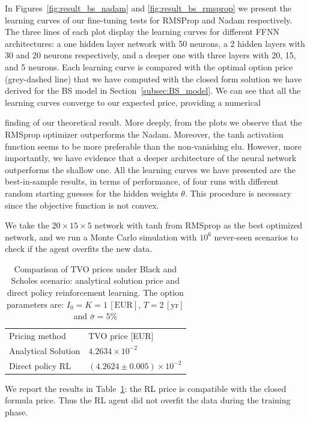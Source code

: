 \documentclass[runningheads]{m2ef}
\newcommand\soutpars[1]{\let\helpcmd\sout\parhelp#1\par\relax\relax}
\newcommand{\change}[1]{{\color{red} {#1}}}%
\newcommand{\remove}[1]{{\color{red} \soutpars{{#1}}}}%
\begin{document}
In Figures~\ref{fig:result_bs_nadam} and \ref{fig:result_bs_rmsprop} we present the learning curves of our fine-tuning tests for RMSProp and Nadam respectively. The three lines of each plot display the learning curves for different FFNN architectures: a one hidden layer network with 50 neurons, a 2 hidden layers with 30 and 20 neurons respectively, and a deeper one with three layers with 20, 15, and 5 neurons. Each learning curve is compared with the optimal option price (grey-dashed line) that we have computed with the closed form solution we have derived for the BS model in Section~\ref{subsec:BS_model}. We can see that all the learning curves converge to our expected price, providing a numerical \remove{demonstration} \change{finding} of our theoretical result. More deeply, from the plots we observe that the RMSprop optimizer outperforms the Nadam. Moreover, the tanh activation function seems to be more preferable than the non-vanishing elu. However, more importantly, we have evidence that a deeper architecture of the neural network outperforms the shallow one. All the learning curves we have presented are the best-in-sample results, in terms of performance, of four runs with different random starting guesses for the hidden weights $\theta$. This procedure is necessary since the objective function is not convex.

We take the $20\times 15 \times 5$ network with tanh from RMSprop as the best optimized network, and we run a Monte Carlo simulation with $10^6$ never-seen scenarios to check if the agent overfits the new data. 
\begin{table}
\begin{center}
\caption{Comparison of TVO prices under Black and Scholes \change{scenario}: analytical solution price and direct policy reinforcement learning. The option parameters are: $I_0=K=1\,[\text{EUR}]$, $T=2\,[\text{yr}]$ and $\bar{\sigma}=5\%$}
\label{tab:mc_results_bs}
\begin{tabular}{ll}
\hline\noalign{\smallskip}
Pricing method & TVO price [EUR] \\
\noalign{\smallskip}
\hline
\noalign{\smallskip}
Analytical Solution & $4.2634\times 10^{-2}$ \\
Direct policy RL & $(4.2624 \pm 0.005) \times 10^{-2}$ \\ 
\hline
\end{tabular}
\end{center}
\end{table}
\setlength{\tabcolsep}{1.4pt}
We report the results in Table~\ref{tab:mc_results_bs}: the RL price is compatible with the closed formula price. Thus the RL agent did not overfit the data during the training phase.
\end{document}
